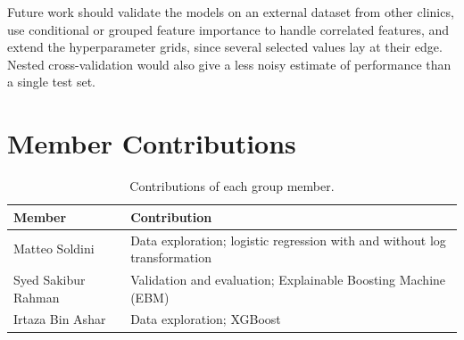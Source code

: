 \documentclass[conference]{IEEEtran}
\begin{document}
Future work should validate the models on an external dataset from other
clinics, use conditional or grouped feature importance to handle correlated
features, and extend the hyperparameter grids, since several selected values
lay at their edge. Nested cross-validation would also give a less noisy
estimate of performance than a single test set.

\section*{Member Contributions}
\label{sec:contributions}

\begin{table}[H]
\centering
\small
\caption{Contributions of each group member.}
\label{tab:contributions}
\begin{tabularx}{\linewidth}{@{}l X@{}}
\toprule
Member & Contribution \\
\midrule
Matteo Soldini      & Data exploration; logistic regression with and
                      without log transformation \\
Syed Sakibur Rahman & Validation and evaluation; Explainable Boosting
                      Machine (EBM) \\
Irtaza Bin Ashar    & Data exploration; XGBoost \\
\bottomrule
\end{tabularx}
\end{table}



\end{document}
